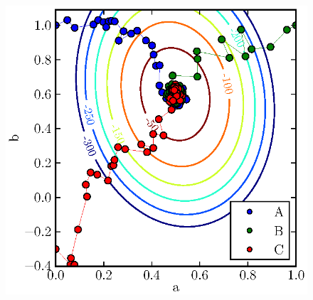 \documentclass[iop,floatfix]{emulateapj}
\begin{document}
\begin{figure}
\begin{center}
  \includegraphics{2d_all}
  \caption{}
\label{fig:2d_all}
\end{center}
\end{figure}




\end{document}

